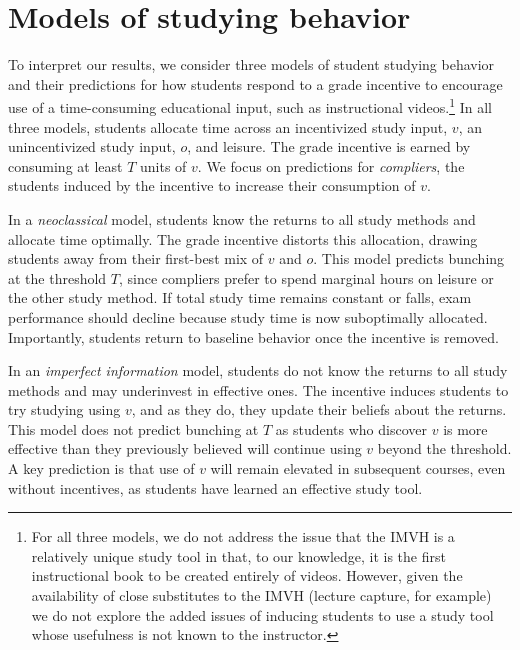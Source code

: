 
\section{Models of studying behavior} \label{sec:models}

To interpret our results, we consider three models of student studying behavior and their predictions for how students respond to a grade incentive to encourage use of a time-consuming educational input, such as instructional videos.\footnote{For all three models, we do not address the issue that the IMVH is a relatively unique study tool in that, to our knowledge, it is the first instructional book to be created entirely of videos.
	However, given the availability of close substitutes to the IMVH (lecture capture, for example) we do not explore the added issues of inducing students to use a study tool whose usefulness is not known to the instructor.
}
In all three models, students allocate time across an incentivized study input, $v$, an unincentivized study input, $o$, and leisure.
The grade incentive is earned by consuming at least $T$ units of $v$.
We focus on predictions for \textit{compliers}, the students induced by the incentive to increase their consumption of $v$.

In a \textit{neoclassical} model, students know the returns to all study methods and allocate time optimally.
The grade incentive distorts this allocation, drawing students away from their first-best mix of $v$ and $o$.
This model predicts bunching at the threshold $T$, since compliers prefer to spend marginal hours on leisure or the other study method.
If total study time remains constant or falls, exam performance should decline because study time is now suboptimally allocated.
Importantly, students return to baseline behavior once the incentive is removed.

In an \textit{imperfect information} model, students do not know the returns to all study methods and may underinvest in effective ones.
The incentive induces students to try studying using $v$, and as they do, they update their beliefs about the returns.
This model does not predict bunching at $T$ as students who discover $v$ is more effective than they previously believed will continue using $v$ beyond the threshold.
A key prediction is that use of $v$ will remain elevated in subsequent courses, even without incentives, as students have learned an effective study tool.

